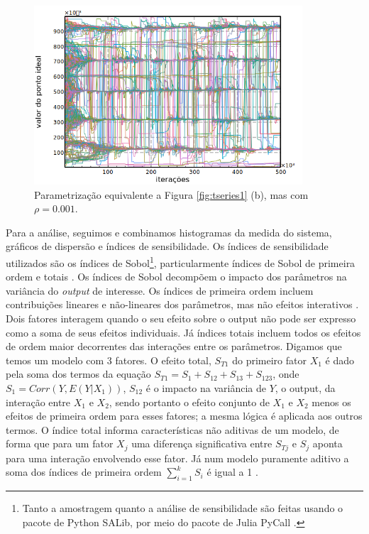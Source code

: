   \begin{figure}[H]
    \centering
    \includegraphics[width =10cm]{ims/ts5.png}
    \caption{Parametrização equivalente a Figura \ref{fig:tseries1} (b),
      mas com \(\rho = 0.001\).}
    \label{fig:nonnullrho}
  \end{figure}

  
  Para a análise, seguimos  e combinamos
  histogramas da medida do sistema, gráficos de dispersão e índices de
  sensibilidade. Os índices de sensibilidade utilizados são os índices de
  Sobol\footnote{Tanto a amostragem quanto a análise de sensibilidade são feitas
    usando o pacote de Python SALib, por meio do pacote de Julia PyCall
    \cite{herman2017salib, johnson2018}.}, particularmente índices de Sobol de
  primeira ordem e totais \cite{saltelli2008global}. Os índices de Sobol
  decompõem o impacto dos parâmetros na variância do \textit{output} de
  interesse. Os índices de primeira ordem incluem contribuições lineares e
  não-lineares dos parâmetros, mas não efeitos interativos
  \cite{ten2016sensitivity}. Dois fatores interagem quando o seu efeito sobre o
  output não pode ser expresso como a soma de seus efeitos individuais. Já
  índices totais incluem todos os efeitos de ordem maior decorrentes das
  interações entre os parâmetros. Digamos que temos um modelo com 3 fatores. O
  efeito total, \(S_{T1}\) do primeiro fator \(X_1\) é dado pela soma dos termos
  da equação \(S_{T1} = S_1 + S_{12} + S_{13} + S_{123}\), onde \(S_1 = Corr(Y,
  E(Y|X_1))\), \(S_{12}\) é o impacto na variância de \(Y\), o output, da
  interação entre \(X_1\) e \(X_2\), sendo portanto o efeito conjunto de \(X_1\)
  e \(X_2\) menos os efeitos de primeira ordem para esses fatores; a mesma
  lógica é aplicada aos outros termos. O índice total informa características
  não aditivas de um modelo, de forma que para um fator \(X_j\) uma diferença
  significativa entre \(S_{Tj}\) e \(S_j\) aponta para uma interação envolvendo
  esse fator. Já num modelo puramente aditivo a soma dos índices de primeira
  ordem \(\sum_{i=1}^k S_i\) é igual a 1 \cite{saltelli2008global}.

